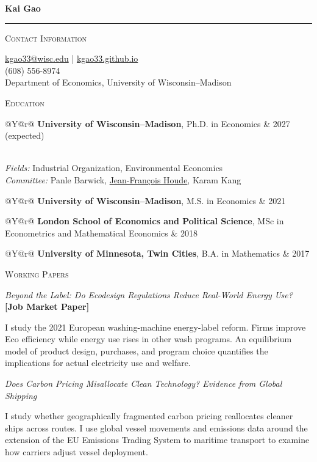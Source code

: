 \documentclass[11pt]{article}
\makeatletter
\newlength{\labelwidthcv}
\newlength{\labelgapcv}
\newlength{\contentwidthcv}
\newcommand{\sectionlabel}[1]{\textsc{#1}}
\newcommand{\vsp}{\vspace{0.20in}}
\newcommand{\smallvsp}{\vspace{0.11in}}
\newcommand{\papertitle}[1]{\textit{#1}}
\newcommand{\cvblock}[2]{%
  \noindent
  \begin{minipage}[t]{\labelwidthcv}
    \vspace{0pt}\raggedright\sectionlabel{#1}
  \end{minipage}%
  \hspace{\labelgapcv}%
  \begin{minipage}[t]{\contentwidthcv}
    \vspace{0pt}#2
  \end{minipage}\par
}
\newcommand{\datedentry}[2]{%
  \begin{tabularx}{\linewidth}{@{}Y@{\hspace{0.7em}}r@{}}
  #1 & #2
  \end{tabularx}%
}
\makeatother
\begin{document}
{\fontsize{18}{21}\selectfont\textbf{Kai Gao}}\\[-0.035in]
\rule{\textwidth}{0.4pt}
\vspace{0.17in}

\cvblock{Contact Information}{%
  \href{mailto:kgao33@wisc.edu}{kgao33@wisc.edu} \quad | \quad \href{https://kgao33.github.io}{kgao33.github.io}\\
  (608) 556-8974\\
  Department of Economics, University of Wisconsin--Madison
}

\vsp

\cvblock{Education}{%
  \datedentry{\textbf{University of Wisconsin--Madison}, Ph.D. in Economics}{2027 (expected)}\\[-0.01in]
  \textit{Fields:} Industrial Organization, Environmental Economics\\
  \textit{Committee:} Panle Barwick, \href{https://jfhoude.econ.wisc.edu/}{Jean-Fran\c{c}ois Houde}, Karam Kang

  \smallvsp
  \datedentry{\textbf{University of Wisconsin--Madison}, M.S. in Economics}{2021}

  \smallvsp
  \datedentry{\textbf{London School of Economics and Political Science}, MSc in Econometrics and Mathematical Economics}{2018}

  \smallvsp
  \datedentry{\textbf{University of Minnesota, Twin Cities}, B.A. in Mathematics}{2017}
}

\vsp

\cvblock{Working Papers}{%
  \papertitle{Beyond the Label: Do Ecodesign Regulations Reduce Real-World Energy Use?} \textbf{[Job Market Paper]}

  \vspace{0.04in}
  I study the 2021 European washing-machine energy-label reform. Firms improve Eco efficiency while energy use rises in other wash programs. An equilibrium model of product design, purchases, and program choice quantifies the implications for actual electricity use and welfare.


  \smallvsp
  \papertitle{Does Carbon Pricing Misallocate Clean Technology? Evidence from Global \mbox{Shipping}}

  \vspace{0.04in}
  I study whether geographically fragmented carbon pricing reallocates cleaner ships across routes. I use global vessel movements and emissions data around the extension of the EU Emissions Trading System to maritime transport to examine how carriers adjust vessel deployment.


}
\end{document}
